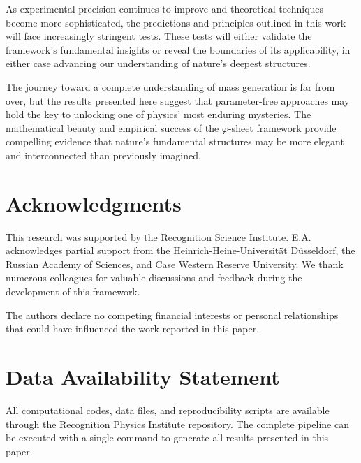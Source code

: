 \documentclass[%
amsmath,amssymb,
aps,
prb,
floatfix,
twocolumn
]{revtex4-2}
\begin{document}
As experimental precision continues to improve and theoretical techniques become more sophisticated, the predictions and principles outlined in this work will face increasingly stringent tests. These tests will either validate the framework's fundamental insights or reveal the boundaries of its applicability, in either case advancing our understanding of nature's deepest structures.

The journey toward a complete understanding of mass generation is far from over, but the results presented here suggest that parameter-free approaches may hold the key to unlocking one of physics' most enduring mysteries. The mathematical beauty and empirical success of the $\varphi$-sheet framework provide compelling evidence that nature's fundamental structures may be more elegant and interconnected than previously imagined.

\section*{Acknowledgments}

This research was supported by the Recognition Science Institute. E.A. acknowledges partial support from the Heinrich-Heine-Universität Düsseldorf, the Russian Academy of Sciences, and Case Western Reserve University. We thank numerous colleagues for valuable discussions and feedback during the development of this framework.

The authors declare no competing financial interests or personal relationships that could have influenced the work reported in this paper.

\section*{Data Availability Statement}

All computational codes, data files, and reproducibility scripts are available through the Recognition Physics Institute repository. The complete pipeline can be executed with a single command to generate all results presented in this paper.
\end{document}

